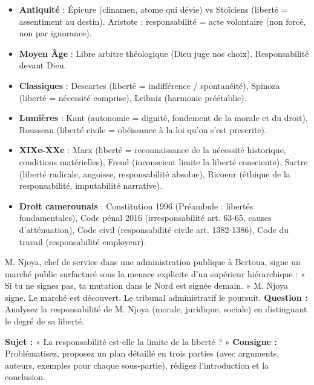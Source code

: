 \documentclass[11pt]{article}
\begin{document}
\begin{savaistu}
\begin{itemize}
\item \textbf{Antiquité} : Épicure (clinamen, atome qui dévie) vs Stoïciens (liberté = assentiment au destin). Aristote : responsabilité = acte volontaire (non forcé, non par ignorance).
\item \textbf{Moyen Âge} : Libre arbitre théologique (Dieu juge nos choix). Responsabilité devant Dieu.
\item \textbf{Classiques} : Descartes (liberté = indifférence / spontanéité), Spinoza (liberté = nécessité comprise), Leibniz (harmonie préétablie).
\item \textbf{Lumières} : Kant (autonomie = dignité, fondement de la morale et du droit), Rousseau (liberté civile = obéissance à la loi qu'on s'est prescrite).
\item \textbf{XIXe-XXe} : Marx (liberté = reconnaissance de la nécessité historique, conditions matérielles), Freud (inconscient limite la liberté consciente), Sartre (liberté radicale, angoisse, responsabilité absolue), Ricoeur (éthique de la responsabilité, imputabilité narrative).
\item \textbf{Droit camerounais} : Constitution 1996 (Préambule : libertés fondamentales), Code pénal 2016 (irresponsabilité art. 63-65, causes d'atténuation), Code civil (responsabilité civile art. 1382-1386), Code du travail (responsabilité employeur).
\end{itemize}
\end{savaistu}

\begin{exercice}
M. Njoya, chef de service dans une administration publique à Bertoua, signe un marché public surfacturé sous la menace explicite d'un supérieur hiérarchique : « Si tu ne signes pas, ta mutation dans le Nord est signée demain. » M. Njoya signe. Le marché est découvert. Le tribunal administratif le poursuit.
\textbf{Question :} Analysez la responsabilité de M. Njoya (morale, juridique, sociale) en distinguant le degré de sa liberté.
\end{exercice}

\begin{exercice}
\textbf{Sujet :} « La responsabilité est-elle la limite de la liberté ? »
\textbf{Consigne :} Problématisez, proposez un plan détaillé en trois parties (avec arguments, auteurs, exemples pour chaque sous-partie), rédigez l'introduction et la conclusion.
\end{exercice}
\end{document}
